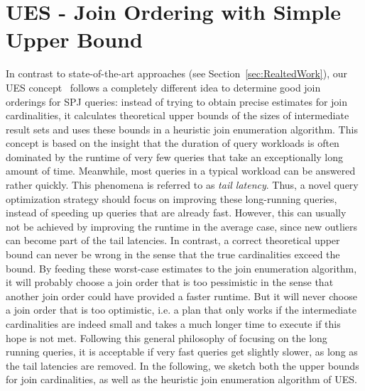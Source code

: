 \section{UES - Join Ordering with Simple Upper Bound}
\label{sec:UES}

In contrast to state-of-the-art approaches (see Section~\ref{sec:RealtedWork}), our UES concept~\cite{hertzschuch-21-ues} follows a completely different idea to determine good join orderings for SPJ queries: instead of trying to obtain precise estimates for join cardinalities, it calculates theoretical upper bounds of the sizes of intermediate result sets and uses these bounds in a heuristic join enumeration algorithm. 
This concept is based on the insight that the duration of query workloads is often dominated by the runtime of very few queries that take an exceptionally long amount of time. 
Meanwhile, most queries in a typical workload can be answered rather quickly. 
This phenomena is referred to as \emph{tail latency}.
Thus, a novel query optimization strategy should focus on improving these long-running queries, instead of speeding up queries that are already fast. 
However, this can usually not be achieved by improving the runtime in the average case, since new outliers can become part of the tail latencies. 
In contrast, a correct theoretical upper bound can never be wrong in the sense that the true cardinalities exceed the bound. 
By feeding these worst-case estimates to the join enumeration algorithm, it will probably choose a join order that is too pessimistic in the sense that another join order could have provided a faster runtime. 
But it will never choose a join order that is too optimistic, i.e. a plan that only works if the intermediate cardinalities are indeed small and takes a much longer time to execute if this hope is not met. Following this general philosophy of focusing on the long running queries, it is acceptable if very fast queries get slightly slower, as long as the tail latencies are removed. In the following, we sketch both the upper bounds for join cardinalities, as well as the heuristic join enumeration algorithm of UES.


